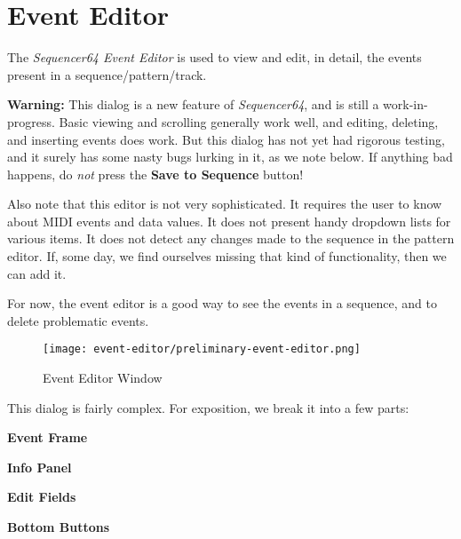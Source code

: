 %
%

\section{Event Editor}
\label{sec:seq64_event_editor}

   The \textsl{Sequencer64 Event Editor} is used to view and edit,
   in detail, the events present in a sequence/pattern/track.

   \textbf{Warning:}
   This dialog is a new feature of \textsl{Sequencer64}, and is
   still a work-in-progress.  Basic viewing and scrolling generally work well,
   and editing, deleting, and inserting events does work.
   But this dialog has not yet had rigorous testing, and it surely
   has some nasty bugs lurking in it, as we note below.
   If anything bad happens, do \textsl{not} press the
   \textbf{Save to Sequence} button!

   Also note that this editor is not very sophisticated.  It requires the user
   to know about MIDI events and data values.  It does not present handy
   dropdown lists for various items.
   It does not detect any changes made to the sequence in the pattern editor.
   If, some day, we find ourselves missing
   that kind of functionality, then we can add it.

   For now, the event editor is a good way to see the events in a sequence,
   and to delete problematic events.

\begin{figure}[H]
   \centering 
   \texttt{[image: event-editor/preliminary-event-editor.png]}
   \caption{Event Editor Window}
   \label{fig:event_editor_window}
\end{figure}

   This dialog is fairly complex.
   For exposition, we break it into a few parts:

   \begin{enumber}
      \item \textbf{Event Frame}
      \item \textbf{Info Panel}
      \item \textbf{Edit Fields}
      \item \textbf{Bottom Buttons}
   \end{enumber}

